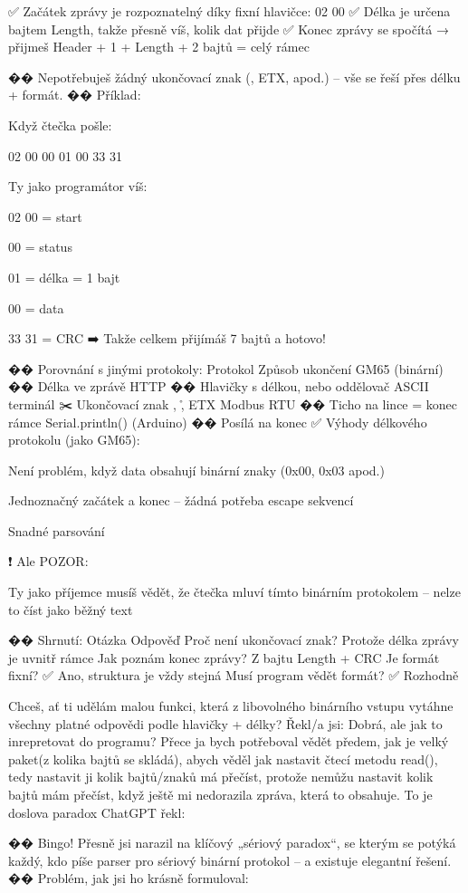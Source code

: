 ✅ Začátek zprávy je rozpoznatelný díky fixní hlavičce: 02 00
✅ Délka je určena bajtem Length, takže přesně víš, kolik dat přijde
✅ Konec zprávy se spočítá → přijmeš Header + 1 + Length + 2 bajtů = celý rámec

�� Nepotřebuješ žádný ukončovací znak (\n, ETX, apod.) – vše se řeší přes délku + formát.
�� Příklad:

Když čtečka pošle:

02 00 00 01 00 33 31

Ty jako programátor víš:

    02 00 = start

    00 = status

    01 = délka = 1 bajt

    00 = data

    33 31 = CRC ➡️ Takže celkem přijímáš 7 bajtů a hotovo!

�� Porovnání s jinými protokoly:
Protokol	Způsob ukončení
GM65 (binární)	�� Délka ve zprávě
HTTP	�� Hlavičky s délkou, nebo oddělovač
ASCII terminál	✂️ Ukončovací znak \n, \r, ETX
Modbus RTU	�� Ticho na lince = konec rámce
Serial.println() (Arduino)	�� Posílá \n na konec
✅ Výhody délkového protokolu (jako GM65):

    Není problém, když data obsahují binární znaky (0x00, 0x03 apod.)

    Jednoznačný začátek a konec – žádná potřeba escape sekvencí

    Snadné parsování

❗ Ale POZOR:

    Ty jako příjemce musíš vědět, že čtečka mluví tímto binárním protokolem – nelze to číst jako běžný text

�� Shrnutí:
Otázka	Odpověď
Proč není ukončovací znak?	Protože délka zprávy je uvnitř rámce
Jak poznám konec zprávy?	Z bajtu Length + CRC
Je formát fixní?	✅ Ano, struktura je vždy stejná
Musí program vědět formát?	✅ Rozhodně

Chceš, ať ti udělám malou funkci, která z libovolného binárního vstupu vytáhne všechny platné odpovědi podle hlavičky + délky?
Řekl/a jsi:
Dobrá, ale jak to inrepretovat do programu? Přece ja bych potřeboval vědět předem, jak je velký paket(z kolika bajtů se skládá), abych věděl jak nastavit čtecí metodu read(), tedy nastavit ji kolik bajtů/znaků má přečíst, protože nemůžu nastavit kolik bajtů mám přečíst, když ještě mi nedorazila zpráva, která to obsahuje. To je doslova paradox
ChatGPT řekl:

�� Bingo! Přesně jsi narazil na klíčový „sériový paradox“, se kterým se potýká každý, kdo píše parser pro sériový binární protokol – a existuje elegantní řešení.
�� Problém, jak jsi ho krásně formuloval:

